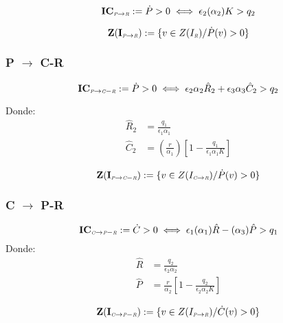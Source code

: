 \begin{equation} \mathbf{IC_{\textit{\tiny P} \to \textit{\tiny R}}} := \dot{P}>0 \iff \epsilon_2(\alpha_2) K > q_2 \end{equation}

\begin{equation}
\mathbf{Z(I_{\textit{\tiny P} \to \textit{\tiny R}})} := \{v \in Z(I_{\textit{\tiny R}}) / \dot{P}(v) > 0\}
\end{equation}

            
\subsubsection{P $\to$ C-R}

\begin{equation} \mathbf{IC_{\textit{\tiny P} \to \textit{\tiny C}-\textit{\tiny R}}} := \dot{P} >0 \iff \epsilon_2\alpha_2\hat{R}_2 + \epsilon_3\alpha_3\hat{C}_2 > q_2 \end{equation}

Donde:
\begin{equation}
\begin{aligned}
\hat{R}_2 &= \frac{q_1}{\epsilon_1 \alpha_1} \\
\hat{C}_2 &=  (\frac{r}{\alpha_1}) \left[ 1 - \frac{q_1}{\epsilon_1 \alpha_1 K} \right] 
\end{aligned}
\end{equation}

\begin{equation}
\mathbf{Z(I_{\textit{\tiny P} \to \textit{\tiny C}-\textit{\tiny R}})} := \{v \in Z(I_{\textit{\tiny C} \to \textit{\tiny R}}) / \dot{P}(v) > 0\}
\end{equation}


\subsubsection{C $\to$ P-R}

\begin{equation} \mathbf{IC_{\textit{\tiny C} \to \textit{\tiny P}-\textit{\tiny R}}} := \dot{C}>0 \iff \epsilon_1(\alpha_1)\hat{R} - (\alpha_3)\hat{P}> q_1 \end{equation}
Donde:
\begin{equation}
\begin{aligned}
\hat{R} & = \frac{q_2}{\epsilon_2 \alpha_2} \\
\hat{P} & = \frac{r}{\alpha_2}\left[ 1- \frac{q_2}{\epsilon_2 \alpha_2 K} \right]
\end{aligned}
\end{equation}

\begin{equation}
\mathbf{Z(I_{\textit{\tiny C} \to \textit{\tiny P}-\textit{\tiny R}})} := \{v \in Z(I_{\textit{\tiny P} \to \textit{\tiny R}}) / \dot{C}(v) > 0\}
\end{equation}


